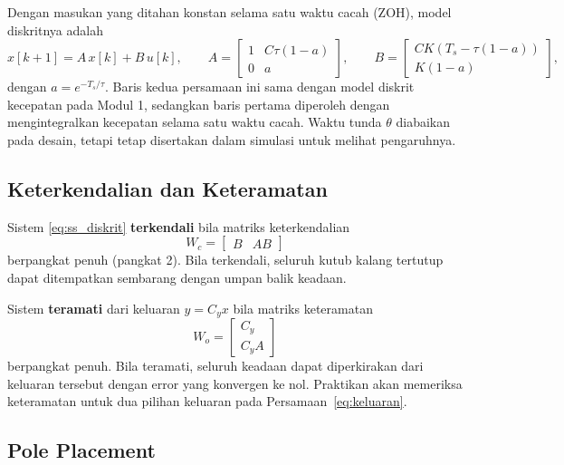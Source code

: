 \documentclass[11pt,a4paper]{article}
\begin{document}
Dengan masukan yang ditahan konstan selama satu waktu cacah (ZOH), model diskritnya adalah
\begin{equation}
x[k+1] = A\,x[k] + B\,u[k],
\qquad
A = \begin{bmatrix} 1 & C\tau(1-a) \\ 0 & a \end{bmatrix},
\qquad
B = \begin{bmatrix} CK\left(T_s - \tau(1-a)\right) \\ K(1-a) \end{bmatrix},
\label{eq:ss_diskrit}
\end{equation}
dengan $a = e^{-T_s/\tau}$. Baris kedua persamaan ini sama dengan model diskrit kecepatan pada Modul 1, sedangkan baris pertama diperoleh dengan mengintegralkan kecepatan selama satu waktu cacah. Waktu tunda $\theta$ diabaikan pada desain, tetapi tetap disertakan dalam simulasi untuk melihat pengaruhnya.

\subsection{Keterkendalian dan Keteramatan}
Sistem \eqref{eq:ss_diskrit} \textbf{terkendali} bila matriks keterkendalian
\begin{equation}
W_c = \begin{bmatrix} B & AB \end{bmatrix}
\label{eq:wc}
\end{equation}
berpangkat penuh (pangkat 2). Bila terkendali, seluruh kutub kalang tertutup dapat ditempatkan sembarang dengan umpan balik keadaan.

Sistem \textbf{teramati} dari keluaran $y = C_y x$ bila matriks keteramatan
\begin{equation}
W_o = \begin{bmatrix} C_y \\ C_y A \end{bmatrix}
\label{eq:wo}
\end{equation}
berpangkat penuh. Bila teramati, seluruh keadaan dapat diperkirakan dari keluaran tersebut dengan error yang konvergen ke nol. Praktikan akan memeriksa keteramatan untuk dua pilihan keluaran pada Persamaan~\eqref{eq:keluaran}.

\subsection{Pole Placement}
\end{document}
